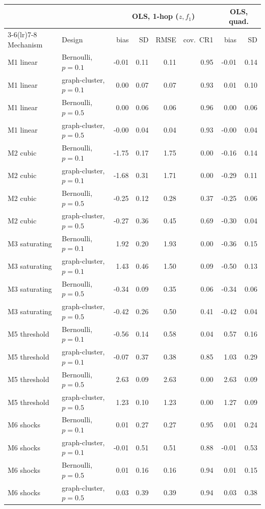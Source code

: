 \begin{tabular}{llrrrrrr}
\toprule
 & & \multicolumn{4}{c}{OLS, 1-hop ($z,f_1$)} & \multicolumn{2}{c}{OLS, quad.} \\
\cmidrule(lr){3-6}\cmidrule(lr){7-8}
Mechanism & Design & bias & SD & RMSE & cov.\ CR1 & bias & SD \\
\midrule
M1 linear & Bernoulli, $p=0.1$ & -0.01 & 0.11 & 0.11 & 0.95 & -0.01 & 0.14 \\
M1 linear & graph-cluster, $p=0.1$ & 0.00 & 0.07 & 0.07 & 0.93 & 0.01 & 0.10 \\
M1 linear & Bernoulli, $p=0.5$ & 0.00 & 0.06 & 0.06 & 0.96 & 0.00 & 0.06 \\
M1 linear & graph-cluster, $p=0.5$ & -0.00 & 0.04 & 0.04 & 0.93 & -0.00 & 0.04 \\
\midrule
M2 cubic & Bernoulli, $p=0.1$ & -1.75 & 0.17 & 1.75 & 0.00 & -0.16 & 0.14 \\
M2 cubic & graph-cluster, $p=0.1$ & -1.68 & 0.31 & 1.71 & 0.00 & -0.29 & 0.11 \\
M2 cubic & Bernoulli, $p=0.5$ & -0.25 & 0.12 & 0.28 & 0.37 & -0.25 & 0.06 \\
M2 cubic & graph-cluster, $p=0.5$ & -0.27 & 0.36 & 0.45 & 0.69 & -0.30 & 0.04 \\
\midrule
M3 saturating & Bernoulli, $p=0.1$ & 1.92 & 0.20 & 1.93 & 0.00 & -0.36 & 0.15 \\
M3 saturating & graph-cluster, $p=0.1$ & 1.43 & 0.46 & 1.50 & 0.09 & -0.50 & 0.13 \\
M3 saturating & Bernoulli, $p=0.5$ & -0.34 & 0.09 & 0.35 & 0.06 & -0.34 & 0.06 \\
M3 saturating & graph-cluster, $p=0.5$ & -0.42 & 0.26 & 0.50 & 0.41 & -0.42 & 0.04 \\
\midrule
M5 threshold & Bernoulli, $p=0.1$ & -0.56 & 0.14 & 0.58 & 0.04 & 0.57 & 0.16 \\
M5 threshold & graph-cluster, $p=0.1$ & -0.07 & 0.37 & 0.38 & 0.85 & 1.03 & 0.29 \\
M5 threshold & Bernoulli, $p=0.5$ & 2.63 & 0.09 & 2.63 & 0.00 & 2.63 & 0.09 \\
M5 threshold & graph-cluster, $p=0.5$ & 1.23 & 0.10 & 1.23 & 0.00 & 1.27 & 0.09 \\
\midrule
M6 shocks & Bernoulli, $p=0.1$ & 0.01 & 0.27 & 0.27 & 0.95 & 0.01 & 0.24 \\
M6 shocks & graph-cluster, $p=0.1$ & -0.01 & 0.51 & 0.51 & 0.88 & -0.01 & 0.53 \\
M6 shocks & Bernoulli, $p=0.5$ & 0.01 & 0.16 & 0.16 & 0.94 & 0.01 & 0.15 \\
M6 shocks & graph-cluster, $p=0.5$ & 0.03 & 0.39 & 0.39 & 0.94 & 0.03 & 0.38 \\
\bottomrule
\end{tabular}
